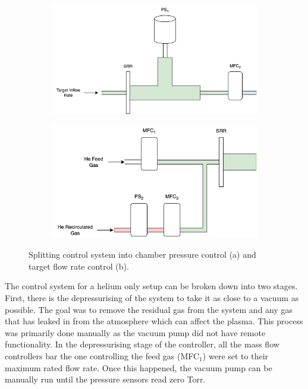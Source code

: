 \begin{figure}[h!]
    \centering
    \begin{subfigure}{0.7\linewidth}
        \centering
        \includegraphics[width=\linewidth]{chapter_5/figures/He_chamber_pressure_controller.png}
        \caption{}
    \end{subfigure}
    \hfill
    \begin{subfigure}{0.7\linewidth}
        \centering
        \includegraphics[width=\linewidth]{chapter_5/figures/He_target_flow_rate_controller.png}
        \caption{}
    \end{subfigure}
    \caption{Splitting control system into chamber pressure control (a) and target flow rate control (b).}
    \label{fig:He_controller_split}
\end{figure}

The control system for a helium only setup can be broken down into two stages. First, there is the depressurising of the system to take it as close to a vacuum as possible. The goal was to remove the residual gas from the system and any gas that has leaked in from the atmosphere which can affect the plasma. This process was primarily done manually as the vacuum pump did not have remote functionality. In the depressurising stage of the controller, all the mass flow controllers bar the one controlling the feed gas (MFC$_1$) were set to their maximum rated flow rate. Once this happened, the vacuum pump can be manually run until the pressure sensors read  zero Torr. 

